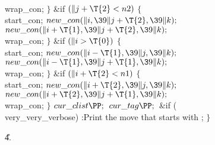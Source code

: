 \\{wrap\_con};\6
\4${}\}{}$\2\6
\&{if} ${}(\|j+\T{2}<\\{n2}){}$\5
${}\{{}$\1\6
\\{start\_con};\6
${}\\{new\_con}(\|i,\39\|j+\T{2},\39\|k);{}$\6
${}\\{new\_con}(\|i+\T{1},\39\|j+\T{2},\39\|k);{}$\6
\\{wrap\_con};\6
\4${}\}{}$\2\6
\&{if} ${}(\|i>\T{0}){}$\5
${}\{{}$\1\6
\\{start\_con};\6
${}\\{new\_con}(\|i-\T{1},\39\|j,\39\|k);{}$\6
${}\\{new\_con}(\|i-\T{1},\39\|j+\T{1},\39\|k);{}$\6
\\{wrap\_con};\6
\4${}\}{}$\2\6
\&{if} ${}(\|i+\T{2}<\\{n1}){}$\5
${}\{{}$\1\6
\\{start\_con};\6
${}\\{new\_con}(\|i+\T{2},\39\|j,\39\|k);{}$\6
${}\\{new\_con}(\|i+\T{2},\39\|j+\T{1},\39\|k);{}$\6
\\{wrap\_con};\6
\4${}\}{}$\2\6
${}\\{cur\_clist}\PP;{}$\6
${}\\{cur\_tag}\PP;{}$\6
\&{if} (\\{very\_very\_verbose})\1\5
:Print the move that starts with \X;\2\6
\4${}\}{}$\2\2\2\par
\U4.\fi

